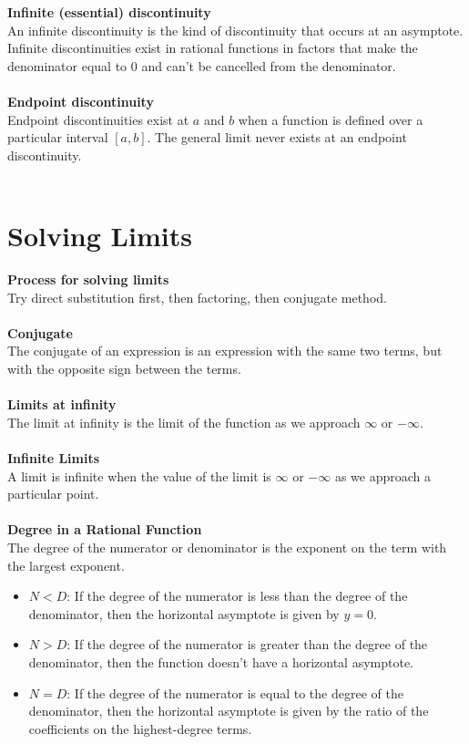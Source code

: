 \noindent \textbf{Infinite (essential) discontinuity}\\
An infinite discontinuity is the kind of discontinuity that occurs at an 
asymptote. Infinite discontinuities exist in rational functions in factors that 
make the denominator equal to 0 and can't be cancelled from the denominator.\\\\

\noindent \textbf{Endpoint discontinuity}\\
Endpoint discontinuities exist at $a$ and $b$ when a function is defined over a 
particular interval $[a, b]$. The general limit never exists at an endpoint 
discontinuity.\\\\


\section{Solving Limits}

\noindent \textbf{Process for solving limits}\\
Try direct substitution first, then factoring, then conjugate method.\\\\

\noindent \textbf{Conjugate}\\
The conjugate of an expression is an expression with the same two terms, but 
with the opposite sign between the terms.\\\\

\noindent \textbf{Limits at infinity}\\
The limit at infinity is the limit of the function as we approach $\infty$ or 
$-\infty$.\\\\

\noindent \textbf{Infinite Limits}\\
A limit is infinite when the value of the limit is $\infty$ or $-\infty$ as we 
approach a particular point.\\\\

\noindent \textbf{Degree in a Rational Function}\\
The degree of the numerator or denominator is the exponent on the term with the 
largest exponent.
\begin{itemize}
  \item $N<D$: If the degree of the numerator is less than the degree of the 
               denominator, then the horizontal asymptote is given by $y=0$.
  \item $N>D$: If the degree of the numerator is greater than the degree of the 
               denominator, then the function doesn't have a horizontal 
               asymptote.
  \item $N=D$: If the degree of the numerator is equal to the degree of the 
               denominator, then the horizontal asymptote is given by the ratio 
               of the coefficients on the highest-degree terms.\\\\
\end{itemize}


